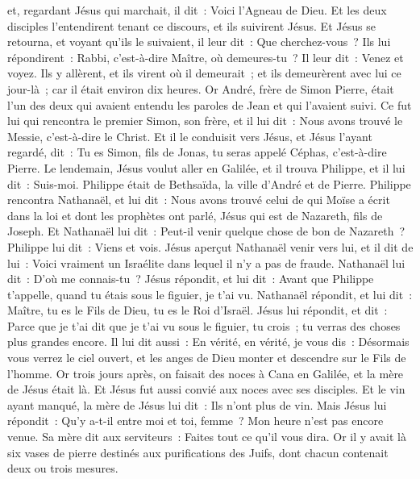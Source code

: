 \begin{multicols}{2}
et, regardant Jésus qui marchait, il dit~: Voici l'Agneau de Dieu.
Et les deux disciples l'entendirent tenant ce discours, et ils suivirent Jésus.
Et Jésus se retourna, et voyant qu'ils le suivaient, il leur dit~: Que cherchez-vous~? Ils lui répondirent~: Rabbi, c'est-à-dire Maître, où demeures-tu~?
Il leur dit~: Venez et voyez. Ils y allèrent, et ils virent où il demeurait~; et ils demeurèrent avec lui ce jour-là~; car il était environ dix heures.
Or André, frère de Simon Pierre, était l'un des deux qui avaient entendu les paroles de Jean et qui l'avaient suivi.
Ce fut lui qui rencontra le premier Simon, son frère, et il lui dit~: Nous avons trouvé le Messie, c'est-à-dire le Christ.
Et il le conduisit vers Jésus, et Jésus l'ayant regardé, dit~: Tu es Simon, fils de Jonas, tu seras appelé Céphas, c'est-à-dire Pierre.
Le lendemain, Jésus voulut aller en Galilée, et il trouva Philippe, et il lui dit~: Suis-moi.
Philippe était de Bethsaïda, la ville d'André et de Pierre.
Philippe rencontra Nathanaël, et lui dit~: Nous avons trouvé celui de qui Moïse a écrit dans la loi et dont les prophètes ont parlé, Jésus qui est de Nazareth, fils de Joseph.
Et Nathanaël lui dit~: Peut-il venir quelque chose de bon de Nazareth~? Philippe lui dit~: Viens et vois.
Jésus aperçut Nathanaël venir vers lui, et il dit de lui~: Voici vraiment un Israélite dans lequel il n'y a pas de fraude.
Nathanaël lui dit~: D'où me connais-tu~? Jésus répondit, et lui dit~: Avant que Philippe t'appelle, quand tu étais sous le figuier, je t'ai vu.
Nathanaël répondit, et lui dit~: Maître, tu es le Fils de Dieu, tu es le Roi d'Israël.
Jésus lui répondit, et dit~: Parce que je t'ai dit que je t'ai vu sous le figuier, tu crois~; tu verras des choses plus grandes encore.
Il lui dit aussi~: En vérité, en vérité, je vous dis~: Désormais vous verrez le ciel ouvert, et les anges de Dieu monter et descendre sur le Fils de l'homme.
\VerseOne{}Or trois jours après, on faisait des noces à Cana en Galilée, et la mère de Jésus était là.
Et Jésus fut aussi convié aux noces avec ses disciples.
Et le vin ayant manqué, la mère de Jésus lui dit~: Ils n'ont plus de vin.
Mais Jésus lui répondit~: Qu'y a-t-il entre moi et toi, femme~? Mon heure n'est pas encore venue.
Sa mère dit aux serviteurs~: Faites tout ce qu'il vous dira.
Or il y avait là six vases de pierre destinés aux purifications des Juifs, dont chacun contenait deux ou trois mesures.

\end{multicols}
